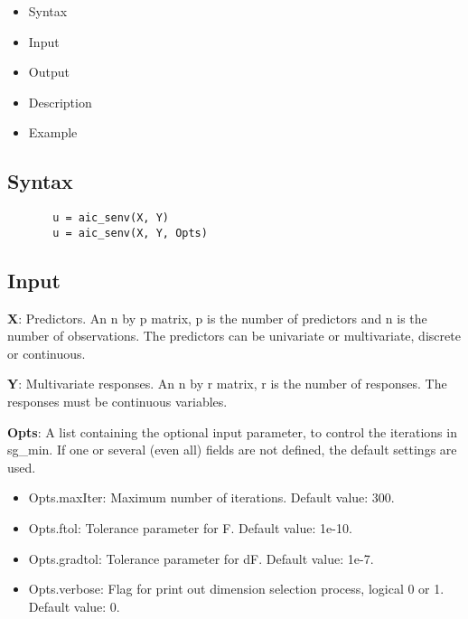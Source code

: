 \documentclass[a4paper,11pt,openany]{memoir}
\begin{document}
\begin{itemize}
\setlength{\itemsep}{-1ex}
   \item Syntax
   \item Input
   \item Output
   \item Description
   \item Example
\end{itemize}


\subsection*{Syntax}


\begin{verbatim}       u = aic_senv(X, Y)
       u = aic_senv(X, Y, Opts)\end{verbatim}
    

\subsection*{Input}

\begin{par}
\textbf{X}: Predictors. An n by p matrix, p is the number of predictors and n is the number of observations. The predictors can be univariate or multivariate, discrete or continuous.
\end{par} \vspace{1em}
\begin{par}
\textbf{Y}: Multivariate responses. An n by r matrix, r is the number of responses. The responses must be continuous variables.
\end{par} \vspace{1em}
\begin{par}
\textbf{Opts}: A list containing the optional input parameter, to control the iterations in sg\_min. If one or several (even all) fields are not defined, the default settings are used.
\end{par} \vspace{1em}
\begin{itemize}
\setlength{\itemsep}{-1ex}
   \item Opts.maxIter: Maximum number of iterations.  Default value: 300.
   \item Opts.ftol: Tolerance parameter for F.  Default value: 1e-10.
   \item Opts.gradtol: Tolerance parameter for dF.  Default value: 1e-7.
   \item Opts.verbose: Flag for print out dimension selection process, logical 0 or 1. Default value: 0.
\end{itemize}
\end{document}
